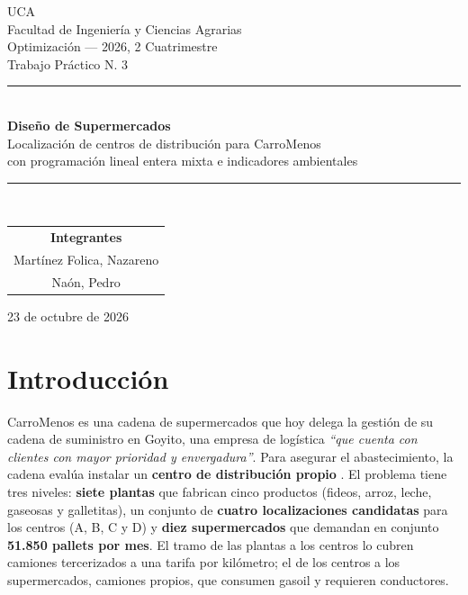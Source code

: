 \documentclass[10pt,a4paper]{article}
\newcommand{\cita}[1]{\emph{``#1''}}
\begin{document}
\begin{titlepage}
\begin{center}
\vspace*{1.2cm}
{\large UCA}\\[2pt]
{\large Facultad de Ingeniería y Ciencias Agrarias}\\[1.4cm]

{\large Optimización — 2026, 2\textdegree{} Cuatrimestre}\\[0.3cm]
{\large Trabajo Práctico N.\textdegree{} 3}\\[1.8cm]

\rule{0.85\linewidth}{0.6pt}\\[0.5cm]
{\Huge\bfseries\color{accent} Diseño de Supermercados}\\[0.5cm]
{\Large Localización de centros de distribución para CarroMenos\\
con programación lineal entera mixta e indicadores ambientales}\\[0.5cm]
\rule{0.85\linewidth}{0.6pt}\\[2.2cm]

\begin{tabular}{c}
{\large\bfseries Integrantes} \\[0.4cm]
{\large Martínez Folica, Nazareno} \\[0.15cm]
{\large Naón, Pedro}
\end{tabular}

\vfill

{\large 23 de octubre de 2026}
\end{center}
\end{titlepage}

\tableofcontents
\newpage
{}

\section*{Introducción}

CarroMenos es una cadena de supermercados que hoy delega la gestión de su
cadena de suministro en Goyito, una empresa de logística \cita{que cuenta con
clientes con mayor prioridad y envergadura}. Para asegurar el abastecimiento,
la cadena evalúa instalar un \textbf{centro de distribución propio}
\cite{consigna}. El problema tiene tres niveles: \textbf{siete plantas} que
fabrican cinco productos (fideos, arroz, leche, gaseosas y galletitas), un
conjunto de \textbf{cuatro localizaciones candidatas} para los centros (A, B, C
y D) y \textbf{diez supermercados} que demandan en conjunto
\textbf{51.850 pallets por mes}. El tramo de las plantas a los centros lo
cubren camiones tercerizados a una tarifa por kilómetro; el de los centros a
los supermercados, camiones propios, que consumen gasoil y requieren
conductores.
\end{document}
